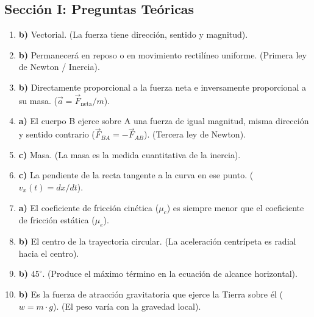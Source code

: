 \documentclass[11pt,a4paper]{article}
\begin{document}
\subsection*{Sección I: Preguntas Teóricas}
\begin{enumerate}
    \item \textbf{b)} Vectorial. (La fuerza tiene dirección, sentido y magnitud).
    \item \textbf{b)} Permanecerá en reposo o en movimiento rectilíneo uniforme. (Primera ley de Newton / Inercia).
    \item \textbf{b)} Directamente proporcional a la fuerza neta e inversamente proporcional a su masa. ($\vec{a} = \vec{F}_{\text{neta}}/m$).
    \item \textbf{a)} El cuerpo B ejerce sobre A una fuerza de igual magnitud, misma dirección y sentido contrario ($\vec{F}_{BA} = -\vec{F}_{AB}$). (Tercera ley de Newton).
    \item \textbf{c)} Masa. (La masa es la medida cuantitativa de la inercia).
    \item \textbf{c)} La pendiente de la recta tangente a la curva en ese punto. ($v_x(t) = dx/dt$).
    \item \textbf{a)} El coeficiente de fricción cinética ($\mu_c$) es siempre menor que el coeficiente de fricción estática ($\mu_e$).
    \item \textbf{b)} El centro de la trayectoria circular. (La aceleración centrípeta es radial hacia el centro).
    \item \textbf{b)} $45^\circ$. (Produce el máximo término en la ecuación de alcance horizontal).
    \item \textbf{b)} Es la fuerza de atracción gravitatoria que ejerce la Tierra sobre él ($w = m \cdot g$). (El peso varía con la gravedad local).
\end{enumerate}
\end{document}

